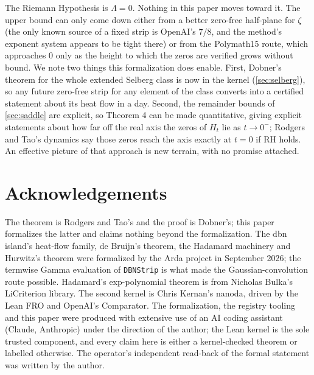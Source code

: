 \documentclass[11pt]{article}
\theoremstyle{definition}
\newcommand{\lean}[1]{\texttt{#1}}
\newcommand{\Lam}{\Lambda}
\newcommand{\Hfun}{H}
\begin{document}
The Riemann Hypothesis is $\Lam = 0$. Nothing in this paper moves toward it. The upper bound can only come down either from a better zero-free half-plane for $\zeta$ (the only known source of a fixed strip is OpenAI's $7/8$, and the method's exponent system appears to be tight there) or from the Polymath15 route, which approaches $0$ only as the height to which the zeros are verified grows without bound. We note two things this formalization does enable. First, Dobner's theorem for the whole extended Selberg class is now in the kernel (\cref{sec:selberg}), so any future zero-free strip for any element of the class converts into a certified statement about its heat flow in a day. Second, the remainder bounds of \cref{sec:saddle} are explicit, so Theorem 4 can be made quantitative, giving explicit statements about how far off the real axis the zeros of $\Hfun_t$ lie as $t \to 0^-$; Rodgers and Tao's dynamics say those zeros reach the axis exactly at $t = 0$ if RH holds. An effective picture of that approach is new terrain, with no promise attached.

\section*{Acknowledgements}

The theorem is Rodgers and Tao's and the proof is Dobner's; this paper formalizes the latter and claims nothing beyond the formalization. The dbn island's heat-flow family, de Bruijn's theorem, the Hadamard machinery and Hurwitz's theorem were formalized by the Arda project in September 2026; the termwise Gamma evaluation of \lean{DBNStrip} is what made the Gaussian-convolution route possible. Hadamard's exp-polynomial theorem is from Nicholas Bulka's LiCriterion library. The second kernel is Chris Kernan's nanoda, driven by the Lean FRO and OpenAI's Comparator. The formalization, the registry tooling and this paper were produced with extensive use of an AI coding assistant (Claude, Anthropic) under the direction of the author; the Lean kernel is the sole trusted component, and every claim here is either a kernel-checked theorem or labelled otherwise. The operator's independent read-back of the formal statement was written by the author.
\end{document}
